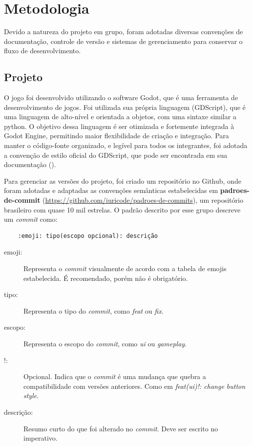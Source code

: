 
\chapter{Metodologia}
\label{cap:metodologia}

Devido a natureza do projeto em grupo, foram adotadas diversas convenções
de documentação, controle de versão e sistemas de gerenciamento para
conservar o fluxo de desenvolvimento.

\section{Projeto}
\label{sec:projeto}

O jogo foi desenvolvido utilizando o software Godot, que é uma ferramenta
de desenvolvimento de jogos. Foi utilizada sua própria linguagem (GDScript),
que é uma linguagem de alto-nível e orientada a objetos, com uma sintaxe
similar a python. O objetivo dessa linguagem é ser otimizada e fortemente
integrada à Godot Engine, permitindo maior flexibilidade de criação e integração.
Para manter o código-fonte organizado, e legível para todos os integrantes, foi
adotada a convenção de estilo oficial do GDScript, que pode ser encontrada em sua
documentação (\cite{gdscript}).

Para gerenciar as versões do projeto, foi criado um repositório no Github,
onde foram adotadas e adaptadas as convenções semânticas estabelecidas em
\textbf{padroes-de-commit} (\url{https://github.com/iuricode/padroes-de-commits}), um repositório
brasileiro com quase 10 mil estrelas. O padrão descrito por esse grupo descreve um
\textit{commit} como:
\begin{verbatim}
	:emoji: tipo(escopo opcional): descrição
\end{verbatim}

\begin{description}
	\item[emoji:] Representa o \textit{commit} visualmente de acordo com a tabela de emojis
	estabelecida. É recomendado, porém não é obrigatório.
	\item[tipo:] Representa o tipo do \textit{commit}, como \textit{feat} ou \textit{fix}.
	\item[escopo:] Representa o escopo do \textit{commit}, como \textit{ui} ou \textit{gameplay}. 
	\item[!:]  Opcional. Indica que o \textit{commit} é uma mudança que quebra a compatibilidade
	com versões anteriores. Como em \textit{feat(ui)!: change button style}.
	\item[descrição:] Resumo curto do que foi alterado no \textit{commit}. Deve ser escrito no
	imperativo.
\end{description}

